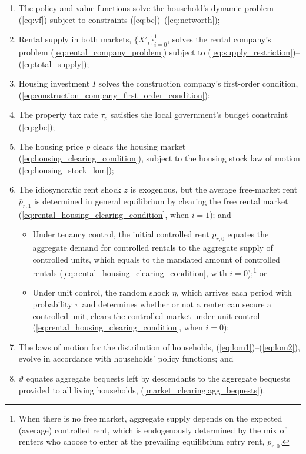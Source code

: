 \documentclass[parskip=full]{article}
\begin{document}
\begin{enumerate}
\item The policy and value functions solve the household's dynamic problem (\ref{eq:vf}) subject to constraints (\ref{eq:bc})--(\ref{eq:networth});
\item Rental supply in both markets, $\{X'_{i}\}^{1}_{i=0}$, solves the rental company's problem (\ref{eq:rental_company_problem}) subject to (\ref{eq:supply_restriction})--(\ref{eq:total_supply});
\item Housing investment $I$ solves the construction company's first-order condition, (\ref{eq:construction_company_first_order_condition});
\item The property tax rate $\tau_p$ satisfies the local government's budget constraint (\ref{eq:gbc});
\item The housing price $p$ clears the housing market
(\ref{eq:housing_clearing_condition}), subject to the housing stock law of motion (\ref{eq:housing_stock_lom});
\item The idiosyncratic rent shock $z$ is exogenous, but the average free-market rent $\overline{p}_{r,1}$ is determined in general equilibrium by clearing the free rental market (\ref{eq:rental_housing_clearing_condition}, when $i=1$); and
\begin{itemize}
    \item Under tenancy control, the initial controlled rent $p_{r,0}$ equates the aggregate demand for controlled rentals to the aggregate supply of controlled units, which equals to the mandated amount of controlled rentals (\ref{eq:rental_housing_clearing_condition}, with $i=0$);\footnote{When there is no free market, aggregate supply depends on the expected (average) controlled rent, which is endogenously determined by the mix of renters who choose to enter at the prevailing equilibrium entry rent, $p_{r,0}$.} or
    \item Under unit control, the random shock $\eta$, which arrives each period with probability $\pi$ and determines whether or not a renter can secure a controlled unit, clears the controlled market under unit control (\ref{eq:rental_housing_clearing_condition}, when $i=0$);
\end{itemize}
\item The laws of motion for the distribution of households, (\ref{eq:lom1})--(\ref{eq:lom2}), evolve in accordance with households' policy functions; and
\item $\vartheta$ equates aggregate bequests left by descendants to the aggregate bequests provided to all living households, (\ref{market_clearing:agg_bequests}).
\end{enumerate}
\end{document}
